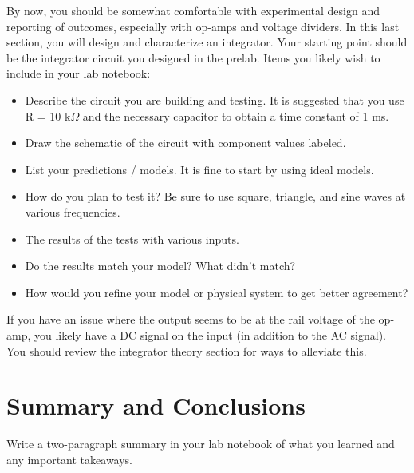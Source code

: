 \documentclass[10pt]{PhysLab1C} %
\begin{document}
By now, you should be somewhat comfortable with experimental design and
reporting of outcomes, especially with op-amps and voltage dividers. In
this last section, you will design and characterize an integrator. Your
starting point should be the integrator circuit you designed in the
prelab. Items you likely wish to include in your lab notebook:

\begin{itemize}
\item
  Describe the circuit you are building and testing. It is suggested
  that you use R = 10 k$\Omega$ and the necessary capacitor to obtain a time
  constant of 1 ms.
\item
  Draw the schematic of the circuit with component values labeled.
\item
  List your predictions / models. It is fine to start by using ideal
  models.
\item
  How do you plan to test it? Be sure to use square, triangle, and sine
  waves at various frequencies.
\item
  The results of the tests with various inputs.
\item
  Do the results match your model? What didn't match?
\item
  How would you refine your model or physical system to get better
  agreement?
\end{itemize}

If you have an issue where the output seems to be at the rail voltage of
the op-amp, you likely have a DC signal on the input (in addition to the
AC signal). You should review the integrator theory section for ways to
alleviate this.

\section{Summary and Conclusions}

Write a two-paragraph summary in your lab notebook of what you learned
and any important takeaways.

\end{document}
